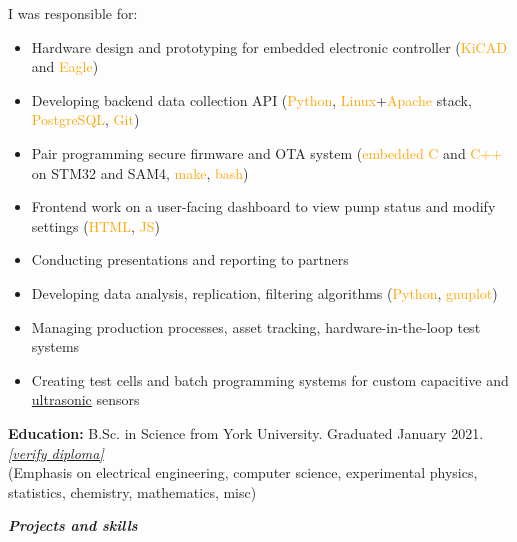 \documentclass[fleqn,11pt]{article}
\newcommand{\ressection}[1]{\textbf{{\Large \textit{#1}}}\xrfill[0.1ex]{0.6pt}}
\newcommand{\sk}[1]{\textcolor{orange}{#1}}
\newcommand{\itemoptions}{\setlength{\itemindent}{-10pt} \setlength\itemsep{-1em}}
\begin{document}
I was responsible for:
\begin{itemize}\itemoptions
\item Hardware design and prototyping for embedded electronic controller (\sk{KiCAD} and \sk{Eagle})
\item Developing backend data collection API (\sk{Python}, \sk{Linux}+\sk{Apache} stack, \sk{PostgreSQL}, \sk{Git}) %
\item Pair programming secure firmware and OTA system (\sk{embedded C} and \sk{C++} on STM32 and SAM4, \sk{make}, \sk{bash})
\item Frontend work on a user-facing dashboard to view pump status and modify settings (\sk{HTML}, \sk{JS})
\item Conducting presentations and reporting to partners
\item Developing data analysis, replication, filtering algorithms (\sk{Python}, \sk{gnuplot})
\item Managing production processes, asset tracking, hardware-in-the-loop test systems
\item Creating test cells and batch programming systems for custom capacitive and \href{https://github.com/0xDBFB7/UltimateUltrasonicAmplifier}{ultrasonic} sensors
\end{itemize}

\light{\makebox[\linewidth]{\rule{\textwidth}{0.4pt}}}

\begin{tcolorbox}
	\textbf{Education:} B.Sc. in Science from York University. Graduated January 2021. \href{https://learner.mycreds.ca/#/sharelink/b664abe7-53a7-4d64-a0f1-bef16337edd0/57724eeb-34ab-4b79-b2a6-cd6bc311039e}{\textit{[verify diploma]}} \\
	{\small(Emphasis on electrical engineering, computer science, experimental physics, statistics, chemistry, mathematics, misc)}
\end{tcolorbox}


\ressection{Projects and skills}
\end{document}
